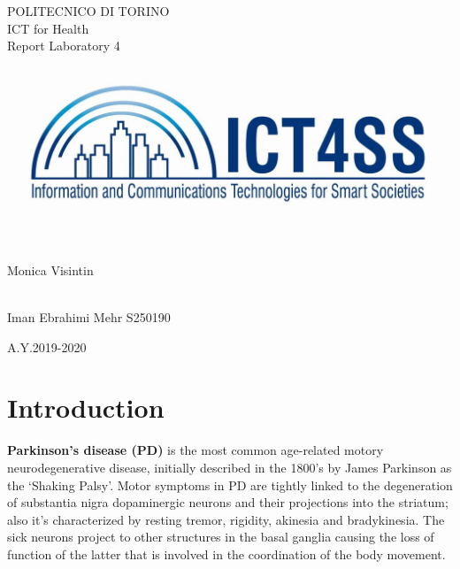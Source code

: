 \documentclass[a4paper,12pt,oneside,titlepage]{article}
\begin{document}
	
	\thispagestyle{empty}
	\setcounter{page}{0}
	
	\begin{center}
		\huge
		POLITECNICO DI TORINO\\[1.cm]
		\Large
		ICT for Health \\
		\vspace{0.5cm}
		\Large
		Report Laboratory 4\\[1.3cm]
		
		\vspace{0.5cm}
		\includegraphics[scale=2]{logo.jpg}
	\end{center}
	\vspace{1.cm}
	
	\begin{flushleft}
		\Large
		\\
		Monica Visintin\\[0.2cm]
	\end{flushleft}
	\vspace{1cm}
	
	
	\begin{flushright} 
		\Large
		\\
		Iman Ebrahimi Mehr S250190\\[0.2cm]
	\end{flushright} 
	\vspace{2cm}
	\begin{center}
		\Large
		A.Y.2019-2020
	\end{center}
	
	\newpage
	\thispagestyle{empty}
	\tableofcontents
	
	
	\newpage
	\section{Introduction}	
	\textbf{Parkinson’s disease (PD)} is the most common age-related motory neurodegenerative disease, initially described in the 1800’s by James Parkinson as the ‘Shaking Palsy’. Motor symptoms in PD are tightly linked to the degeneration of substantia nigra dopaminergic neurons and their projections into the striatum; also it’s characterized by resting tremor, rigidity, akinesia and bradykinesia. The sick neurons project to other structures in the basal ganglia causing the loss of function of the latter that is involved in the coordination of the body movement.
	
\end{document}
